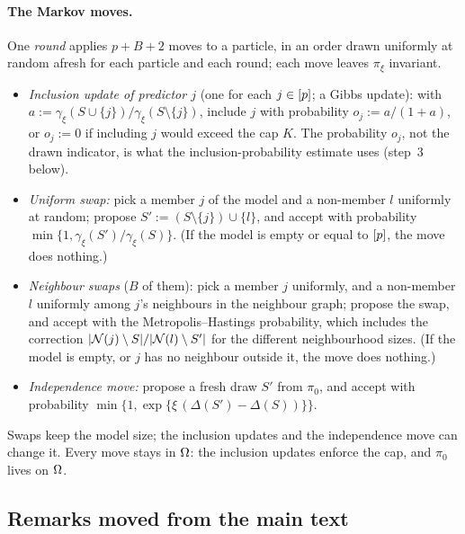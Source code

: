 \paragraph{The Markov moves.} One \emph{round} applies $p+B+2$ moves to a particle, in an order drawn uniformly at random
afresh for each particle and each round; each move leaves $\pi_\xi$ invariant.
\begin{itemize}[leftmargin=1.5em,itemsep=1pt]
  \item \emph{Inclusion update of predictor $j$} (one for each $j\in[p]$; a Gibbs update): with
    $a:=\gamma_\xi(S\cup\{j\})/\gamma_\xi(S\setminus\{j\})$, include $j$ with probability $o_j:=a/(1+a)$, or $o_j:=0$ if
    including $j$ would exceed the cap $K$. The probability $o_j$, not the drawn indicator, is what the inclusion-probability
    estimate uses (step~3 below).
  \item \emph{Uniform swap:} pick a member $j$ of the model and a non-member $l$ uniformly at random; propose
    $S':=(S\setminus\{j\})\cup\{l\}$, and accept with probability $\min\{1,\gamma_\xi(S')/\gamma_\xi(S)\}$. (If
    the model is empty or equal to $[p]$, the move does nothing.)
  \item \emph{Neighbour swaps} ($B$ of them): pick a member $j$ uniformly, and a non-member $l$ uniformly among $j$'s
    neighbours in the neighbour graph; propose the swap, and accept with the Metropolis--Hastings probability, which
    includes the correction $\lvert \mathcal N(j)\setminus S\rvert/\lvert \mathcal N(l)\setminus S'\rvert$ for the different
    neighbourhood sizes. (If the model is empty, or $j$ has no neighbour outside it, the move does nothing.)
  \item \emph{Independence move:} propose a fresh draw $S'$ from $\pi_0$, and accept with probability
    $\min\{1,\exp\{\xi\,(\Delta(S')-\Delta(S))\}\}$.
\end{itemize}
Swaps keep the model size; the inclusion updates and the independence move can change it. Every move stays in $\Omega$:
the inclusion updates enforce the cap, and $\pi_0$ lives on $\Omega$.



\subsection{Remarks moved from the main text}\label{sec:supp-moved}

